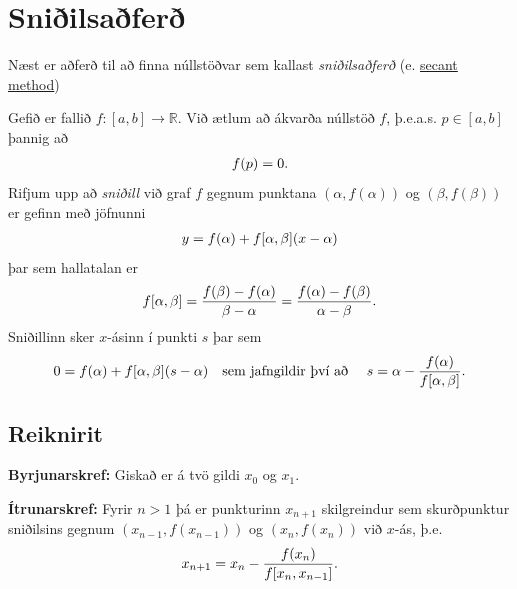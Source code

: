 \documentclass[A4paper,10pt,icelandic]{sphinxmanual}
\begin{document}
\section{Sniðilsaðferð}
\label{kafli02:index-5}\label{kafli02:sniilsafer}
Næst er aðferð til að finna núllstöðvar sem kallast \emph{sniðilsaðferð}
(e. \href{https://en.wikipedia.org/wiki/Secant\_method}{secant method})

Gefið er fallið \(f:[a,b]\to {\mathbb  R}\). Við ætlum að ákvarða
núllstöð \(f\), þ.e.a.s. \(p\in [a,b]\) þannig að
\begin{gather}
\begin{split}f(p)=0.\end{split}\notag
\end{gather}
Rifjum upp að \emph{sniðill} við graf \(f\) gegnum punktana
\((\alpha,f(\alpha))\) og \((\beta,f(\beta))\) er gefinn með
jöfnunni
\begin{gather}
\begin{split}y=f(\alpha)+f[\alpha,\beta](x-\alpha)\end{split}\notag
\end{gather}
þar sem hallatalan er
\begin{gather}
\begin{split}f[\alpha,\beta]=\dfrac{f(\beta)-f(\alpha)}{\beta-\alpha}
=\dfrac{f(\alpha)-f(\beta)}{\alpha -\beta}.\end{split}\notag
\end{gather}
Sniðillinn sker \(x\)-ásinn í punkti \(s\) þar sem
\begin{gather}
\begin{split}0=f(\alpha)+f[\alpha,\beta](s-\alpha) \quad  \text{sem jafngildir því að } \quad
s=\alpha-\dfrac{f(\alpha)}{f[\alpha,\beta]}.\end{split}\notag
\end{gather}

\subsection{Reiknirit}
\label{kafli02:id2}
\textbf{Byrjunarskref:} Giskað er á tvö gildi \(x_0\) og \(x_1\).

\textbf{Ítrunarskref:} Fyrir \(n>1\) þá er punkturinn \(x_{n+1}\)
skilgreindur sem skurðpunktur sniðilsins gegnum \((x_{n-1},f(x_{n-1}))\) og
\((x_n,f(x_n))\) við \(x\)-ás, þ.e.
\begin{gather}
\begin{split}x_{n+1}=x_n-\dfrac{f(x_n)}{f[x_n,x_{n-1}]}.\end{split}\notag
\end{gather}
\end{document}
